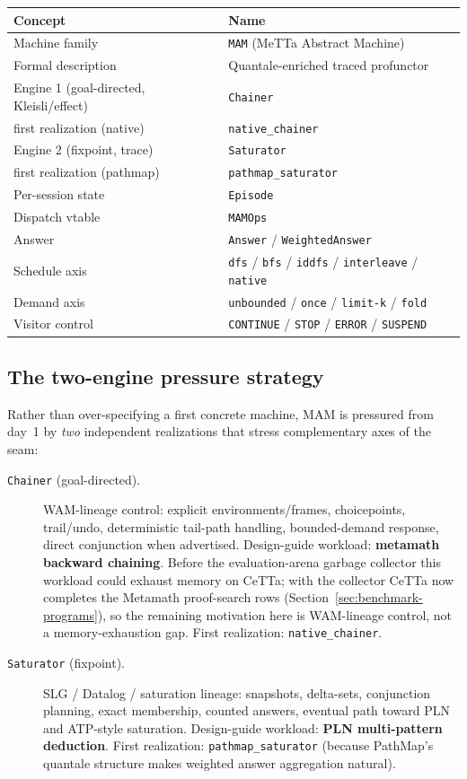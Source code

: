 \documentclass[11pt]{article}
\newcommand{\code}[1]{\texttt{#1}}
\newcommand{\CeTTa}{\textup{CeTTa}}
\newcommand{\PathMap}{\textup{PathMap}}
\begin{document}
\begin{center}
\begin{tabular}{ll}
\toprule
\textbf{Concept} & \textbf{Name} \\
\midrule
Machine family & \code{MAM} (MeTTa Abstract Machine) \\
Formal description & Quantale-enriched traced profunctor \\
Engine 1 (goal-directed, Kleisli/effect) & \code{Chainer} \\
\quad first realization (native) & \code{native\_chainer} \\
Engine 2 (fixpoint, trace) & \code{Saturator} \\
\quad first realization (pathmap) & \code{pathmap\_saturator} \\
Per-session state & \code{Episode} \\
Dispatch vtable & \code{MAMOps} \\
Answer & \code{Answer} / \code{WeightedAnswer} \\
Schedule axis & \code{dfs} / \code{bfs} / \code{iddfs} / \code{interleave} / \code{native} \\
Demand axis & \code{unbounded} / \code{once} / \code{limit-k} / \code{fold} \\
Visitor control & \code{CONTINUE} / \code{STOP} / \code{ERROR} / \code{SUSPEND} \\
\bottomrule
\end{tabular}
\end{center}

\subsection{The two-engine pressure strategy}

Rather than over-specifying a first concrete machine, MAM is
pressured from day~1 by \emph{two} independent realizations that
stress complementary axes of the seam:

\begin{description}
\item[\code{Chainer} (goal-directed).]  WAM-lineage control: explicit
  environments/frames, choicepoints, trail/undo, deterministic
  tail-path handling, bounded-demand response, direct conjunction
  when advertised.  Design-guide workload: \textbf{metamath backward
    chaining}.  Before the evaluation-arena garbage collector this
  workload could exhaust memory on \CeTTa{}; with the collector
  \CeTTa{} now completes the Metamath proof-search rows
  (Section~\ref{sec:benchmark-programs}), so the remaining motivation
  here is WAM-lineage control, not a memory-exhaustion gap.
  First realization: \code{native\_chainer}.
\item[\code{Saturator} (fixpoint).]  SLG / Datalog / saturation
  lineage: snapshots, delta-sets, conjunction planning, exact
  membership, counted answers, eventual path toward PLN and
  ATP-style saturation.  Design-guide workload: \textbf{PLN
    multi-pattern deduction}.  First realization: \code{pathmap\_saturator}
  (because \PathMap{}'s quantale structure makes weighted answer
  aggregation natural).
\end{description}
\end{document}
